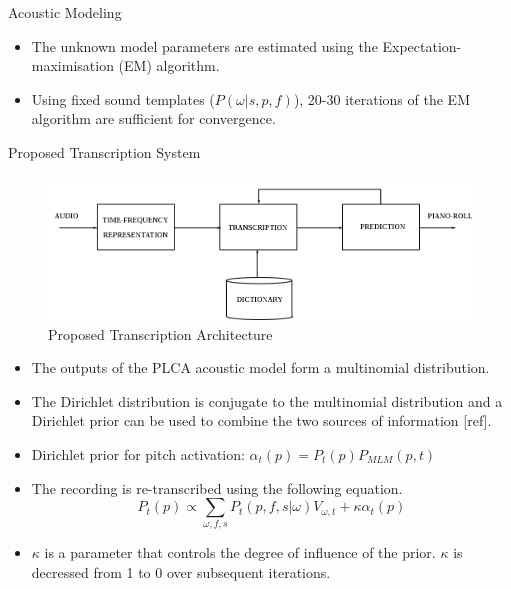 \documentclass[final]{beamer}
\newlength{\onecolwid}
\newlength{\twocolwid}
\begin{document}
\begin{frame}[t]
\begin{columns}[t]
\begin{column}{\twocolwid}
\begin{columns}[t,totalwidth=\twocolwid]
\begin{column}{\onecolwid}
\begin{block}{Acoustic Modeling}
\begin{itemize}
\item The unknown model parameters are estimated using the Expectation-maximisation (EM) algorithm.
\item Using fixed sound templates ($P(\omega|s,p,f)$), 20-30 iterations of the EM algorithm are sufficient for convergence. 
\end{itemize}

\end{block}

\begin{block}{Proposed Transcription System}
\begin{figure}
\includegraphics[width=0.9\linewidth]{system.png}
\caption{Proposed Transcription Architecture}
\end{figure}

\begin{itemize}
\item The outputs of the PLCA acoustic model form a multinomial distribution. 
\item The Dirichlet distribution is conjugate to the multinomial distribution and a Dirichlet prior can be used to combine the two sources of information [ref].
\item Dirichlet prior for pitch activation: $\alpha_t(p) = P_t(p)P_{MLM}(p,t)$
\item The recording is re-transcribed using the following equation.
\begin{equation}
 P_{t}(p) \propto \sum_{\omega,f,s}P_{t}(p,f,s|\omega)V_{\omega,t}+\kappa\alpha_{t}(p) \label{eq:modifiedMStepPitchActivation} 
\end{equation}
\item $\kappa$ is a parameter that controls the degree of influence of the prior. $\kappa$ is decressed from 1 to 0 over subsequent iterations.
\end{itemize}
\end{block}
\end{column} %


\end{columns}
\end{column}
\end{columns}
\end{frame}
\end{document}
